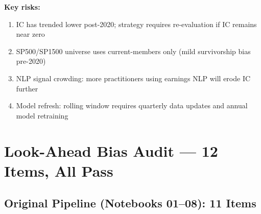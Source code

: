 \documentclass[11pt,a4paper]{article}
\begin{document}
\textbf{Key risks:}
\begin{enumerate}[nosep]
  \item IC has trended lower post-2020; strategy requires re-evaluation if IC remains near zero
  \item SP500/SP1500 universe uses current-members only (mild survivorship bias pre-2020)
  \item NLP signal crowding: more practitioners using earnings NLP will erode IC further
  \item Model refresh: rolling window requires quarterly data updates and annual model retraining
\end{enumerate}

\section{Look-Ahead Bias Audit --- 12 Items, All Pass}

\subsection{Original Pipeline (Notebooks 01--08): 11 Items}
\end{document}
